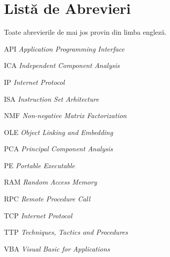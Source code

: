 \chapter*{Listă de Abrevieri}

\thispagestyle{front}

\noindent Toate abrevierile de mai jos provin din limba engleză.

\vspace{0.3cm}

\begin{abbreviations}
    \item[API] \textit{Application Programming Interface}
    \item[ICA] \textit{Independent Component Analysis}
    \item[IP] \textit{Internet Protocol}
    \item[ISA] \textit{Instruction Set Arhitecture}
    \item[NMF] \textit{Non-negative Matrix Factorization}
    \item[OLE] \textit{Object Linking and Embedding}
    \item[PCA] \textit{Principal Component Analysis}
    \item[PE] \textit{Portable Executable}
    \item[RAM] \textit{Random Access Memory}
    \item[RPC] \textit{Remote Procedure Call}
    \item[TCP] \textit{Internet Protocol}
    \item[TTP] \textit{Techniques, Tactics and Procedures}
    \item[VBA] \textit{Visual Basic for Applications}
\end{abbreviations}

\newpage \
